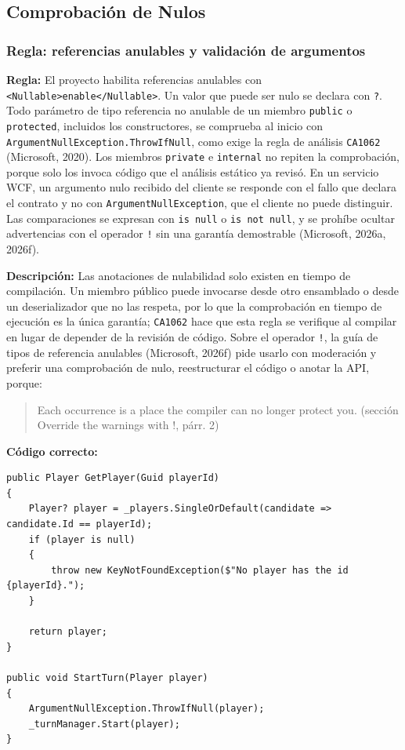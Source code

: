 \subsection{Comprobación de Nulos}

\subsubsection{Regla: referencias anulables y validación de argumentos}

\textbf{Regla:} El proyecto habilita referencias anulables con \texttt{<Nullable>enable</Nullable>}. Un valor que puede ser nulo se declara con \texttt{?}. Todo parámetro de tipo referencia no anulable de un miembro \texttt{public} o \texttt{protected}, incluidos los constructores, se comprueba al inicio con \texttt{ArgumentNullException.ThrowIfNull}, como exige la regla de análisis \texttt{CA1062} (Microsoft, 2020). Los miembros \texttt{private} e \texttt{internal} no repiten la comprobación, porque solo los invoca código que el análisis estático ya revisó. En un servicio WCF, un argumento nulo recibido del cliente se responde con el fallo que declara el contrato y no con \texttt{ArgumentNullException}, que el cliente no puede distinguir. Las comparaciones se expresan con \texttt{is null} o \texttt{is not null}, y se prohíbe ocultar advertencias con el operador \texttt{!} sin una garantía demostrable (Microsoft, 2026a, 2026f).

\textbf{Descripción:} Las anotaciones de nulabilidad solo existen en tiempo de compilación. Un miembro público puede invocarse desde otro ensamblado o desde un deserializador que no las respeta, por lo que la comprobación en tiempo de ejecución es la única garantía; \texttt{CA1062} hace que esta regla se verifique al compilar en lugar de depender de la revisión de código. Sobre el operador \texttt{!}, la guía de tipos de referencia anulables (Microsoft, 2026f) pide usarlo con moderación y preferir una comprobación de nulo, reestructurar el código o anotar la API, porque:
\begin{quote}
Each occurrence is a place the compiler can no longer protect you. (sección Override the warnings with !, párr. 2)
\end{quote}

\textbf{Código correcto:}
\begin{lstlisting}[style=csharpstyle,basicstyle=\ttfamily\scriptsize]
public Player GetPlayer(Guid playerId)
{
    Player? player = _players.SingleOrDefault(candidate => candidate.Id == playerId);
    if (player is null)
    {
        throw new KeyNotFoundException($"No player has the id {playerId}.");
    }

    return player;
}

public void StartTurn(Player player)
{
    ArgumentNullException.ThrowIfNull(player);
    _turnManager.Start(player);
}
\end{lstlisting}

